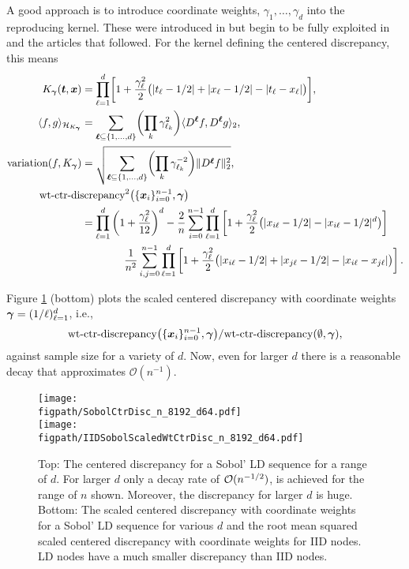 \documentclass{svproc}
\newcommand{\figpath}{Figures}
\begin{document}
A good approach is to introduce coordinate weights, $\gamma_1, \ldots, \gamma_d$ into the reproducing kernel.  These were introduced in \cite{Hic95} but begin to be fully exploited in \cite{SloWoz98} and the articles that followed.  For the kernel defining the centered discrepancy, this means
\begin{align} \label{eq:wtctrkernel}
	K_{\bsgamma}(\bst,\bsx) &= \prod_{\ell = 1}^d \biggl [ 1 + \frac {\gamma_\ell^2}2 \bigl ( \lvert t_\ell - 1/2 \rvert + \lvert x_\ell - 1/2 \rvert - \lvert t_\ell - x_\ell \rvert \bigr ) \biggr] , \\
	\langle f, g \rangle_{\calH_{K_{\bsgamma}}}  &= \sum_{\bsell \subseteq \{1, \ldots, d\}} \biggl(\prod_k \gamma_{\ell_k}^2 \biggr) \langle D^{\bsell}f, D^{\bsell}g \rangle_2, \\
    \label{eq:wtctrvariation}
	\text{variation}(f,K_{\bsgamma})  &= \sqrt{\sum_{\bsell \subseteq \{1, \ldots, d\}} \biggl( \prod_k \gamma_{\ell_k}^{-2} \biggr) \lVert D^{\bsell}f \rVert_2^2}, \\
	\label{eq:wt-ctrdisc}
	\nonumber
	\MoveEqLeft[4]\text{wt-ctr-discrepancy}^2\bigl(\{ \bsx_i\}_{i=0}^{n-1} , \bsgamma\bigr) \\
	\nonumber
	&= \prod_{\ell=1}^d \left ( 1 + \frac{\gamma_{\ell}^2}{12} \right )^d
	- \frac 2n \sum_{i=0}^{n-1} \prod_{\ell=1}^d \left [ 1 + \frac {\gamma_{\ell}^2}2 \bigl ( \lvert x_{i\ell} - 1/2 \rvert - \lvert x_{i\ell} - 1/2 \rvert^d \bigr )\right ] \\
	& \qquad \qquad \frac{1}{n^2} \sum_{i,j=0}^{n-1} \prod_{\ell = 1}^d \left[ 1 + \frac {\gamma_{\ell}^2}2 \bigl ( \lvert x_{i\ell} - 1/2 \rvert + \lvert x_{j\ell} - 1/2 \rvert - \lvert x_{i\ell} - x_{j\ell} \rvert \bigr ) \right].
\end{align}

Figure \ref{fig:scaledweightedcentered} (bottom) plots the scaled centered discrepancy with coordinate weights ${\boldsymbol{\gamma}} = (1/\ell)_{\ell =1}^d$, i.e., 
\begin{equation*}
    \text{wt-ctr-discrepancy}\bigl(\{ {\boldsymbol{x}}_i\}_{i=0}^{n-1},{\boldsymbol{\gamma}} \bigr)/\text{wt-ctr-discrepancy}(\emptyset,{\boldsymbol{\gamma}} ),
\end{equation*}
against sample size for a variety of $d$.  Now, even for larger $d$ there is a reasonable decay that approximates $\mathcal{O}(n^{-1})$.

\begin{figure}[!ht]
    \centering
    \texttt{[image: \\figpath/SobolCtrDisc\_n\_8192\_d64.pdf]} \\
    \texttt{[image: \\figpath/IIDSobolScaledWtCtrDisc\_n\_8192\_d64.pdf]}
    \caption{Top: The centered discrepancy for a Sobol' LD sequence for a range of $d$.  For larger $d$ only a decay rate of ${\mathcal{O}}(n^{-1/2})$, is achieved for the range of $n$ shown.  Moreover, the discrepancy for larger $d$ is huge.
    Bottom:
    The scaled centered discrepancy with coordinate weights for a Sobol' LD sequence for various $d$ and the root mean squared scaled centered discrepancy with coordinate weights for IID nodes.  LD nodes have a much smaller discrepancy than IID nodes.}
    \label{fig:scaledweightedcentered}
\end{figure}
\end{document}
